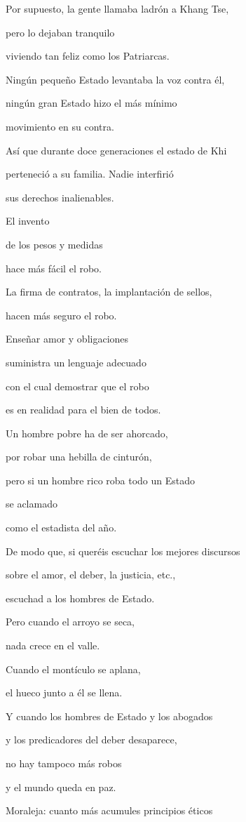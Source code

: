 Por supuesto, la gente llamaba ladrón a Khang Tse,

pero lo dejaban tranquilo

viviendo tan feliz como los Patriarcas.

Ningún pequeño Estado levantaba la voz contra él,

ningún gran Estado hizo el más mínimo

movimiento en su contra.

Así que durante doce generaciones el estado de Khi

perteneció a su familia. Nadie interfirió

sus derechos inalienables.

El invento

de los pesos y medidas

hace más fácil el robo.

La firma de contratos, la implantación de sellos,

hacen más seguro el robo.

Enseñar amor y obligaciones

suministra un lenguaje adecuado

con el cual demostrar que el robo

es en realidad para el bien de todos.

Un hombre pobre ha de ser ahorcado,

por robar una hebilla de cinturón,

pero si un hombre rico roba todo un Estado

se aclamado

como el estadista del año.

De modo que, si queréis escuchar los mejores discursos

sobre el amor, el deber, la justicia, etc.,

escuchad a los hombres de Estado.

Pero cuando el arroyo se seca,

nada crece en el valle.

Cuando el montículo se aplana,

el hueco junto a él se llena.

Y cuando los hombres de Estado y los abogados

y los predicadores del deber desaparece,

no hay tampoco más robos

y el mundo queda en paz.

Moraleja: cuanto más acumules principios éticos

